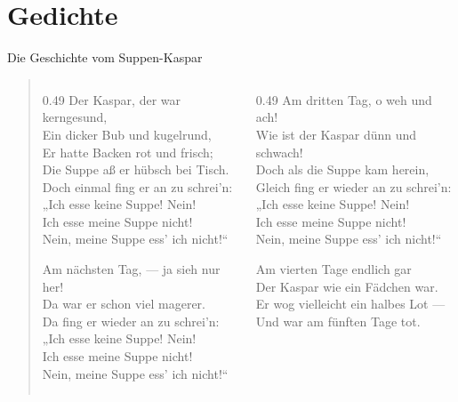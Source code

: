 \documentclass[aspectratio=1610]{beamer}
\begin{document}
\section{Gedichte}
\begin{frame}{Die Geschichte vom Suppen-Kaspar}
	 \begin{verse}
	 	\footnotesize
	 	\begin{columns}[T]
	 		\begin{column}{0.49\textwidth}
 				Der Kaspar, der war kerngesund,\\
	 			Ein dicker Bub und kugelrund,\\
	 			Er hatte Backen rot und frisch;\\
	 			Die Suppe aß er hübsch bei Tisch.\\
	 			Doch einmal fing er an zu schrei’n:\\
	 			„Ich esse keine Suppe! Nein!\\
	 			Ich esse meine Suppe nicht!\\
	 			Nein, meine Suppe ess’ ich nicht!“\linebreak
	 				 			
	 			Am nächsten Tag, — ja sieh nur her!\\
	 			Da war er schon viel magerer.\\
	 			Da fing er wieder an zu schrei’n:\\
	 			„Ich esse keine Suppe! Nein!\\
	 			Ich esse meine Suppe nicht!\\
	 			Nein, meine Suppe ess’ ich nicht!“
	 		\end{column}
	 		\begin{column}{0.49\textwidth}
			 	Am dritten Tag, o weh und ach!\\
	 			Wie ist der Kaspar dünn und schwach!\\
	 			Doch als die Suppe kam herein,\\
	 			Gleich fing er wieder an zu schrei’n:\\
	 			„Ich esse keine Suppe! Nein!\\
	 			Ich esse meine Suppe nicht!\\
	 			Nein, meine Suppe ess’ ich nicht!“\linebreak
	 			
	 			Am vierten Tage endlich gar\\
	 			Der Kaspar wie ein Fädchen war.\\
	 			Er wog vielleicht ein halbes Lot —\\
	 			Und war am fünften Tage tot.\\
	 		\end{column}
	 	\end{columns}	 	
	 \end{verse}
\end{frame}
\end{document}
